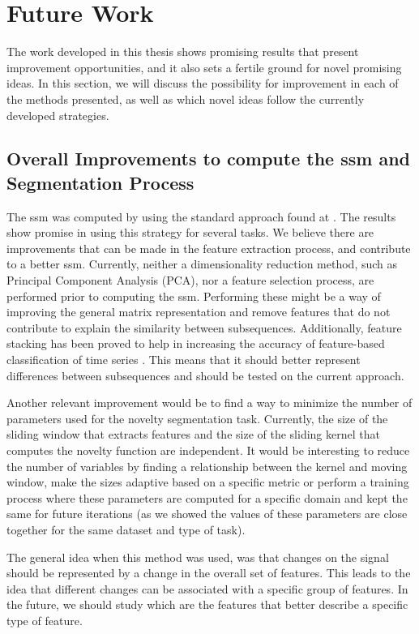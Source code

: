 
%


\chapter{Future Work}
\label{cha:future}



The work developed in this thesis shows promising results that present improvement opportunities, and it also sets a fertile ground for novel promising ideas. In this section, we will discuss the possibility for improvement in each of the methods presented, as well as which novel ideas follow the currently developed strategies.


\section{Overall Improvements to compute the \gls{ssm} and Segmentation Process}

The \gls{ssm} was computed by using the standard approach found at \cite{fmp1}. The results show promise in using this strategy for several tasks. We believe there are improvements that can be made in the feature extraction process, and contribute to a better \gls{ssm}. Currently, neither a dimensionality reduction method, such as Principal Component Analysis (PCA), nor a feature selection process, are performed prior to computing the \gls{ssm}. Performing these might be a way of improving the general matrix representation and remove features that do not contribute to explain the similarity between subsequences. Additionally, feature stacking has been proved to help in increasing the accuracy of feature-based classification of time series \cite{feature_stacking}. This means that it should better represent differences between subsequences and should be tested on the current approach.
\par
Another relevant improvement would be to find a way to minimize the number of parameters used for the novelty segmentation task. Currently, the size of the sliding window that extracts features and the size of the sliding kernel that computes the novelty function are independent. It would be interesting to reduce the number of variables by finding a relationship between the kernel and moving window, make the sizes adaptive based on a specific metric or perform a training process where these parameters are computed for a specific domain and kept the same for future iterations (as we showed the values of these parameters are close together for the same dataset and type of task).
\par
The general idea when this method was used, was that changes on the signal should be represented by a change in the overall set of features. This leads to the idea that different changes can be associated with a specific group of features. In the future, we should study which are the features that better describe a specific type of feature.


